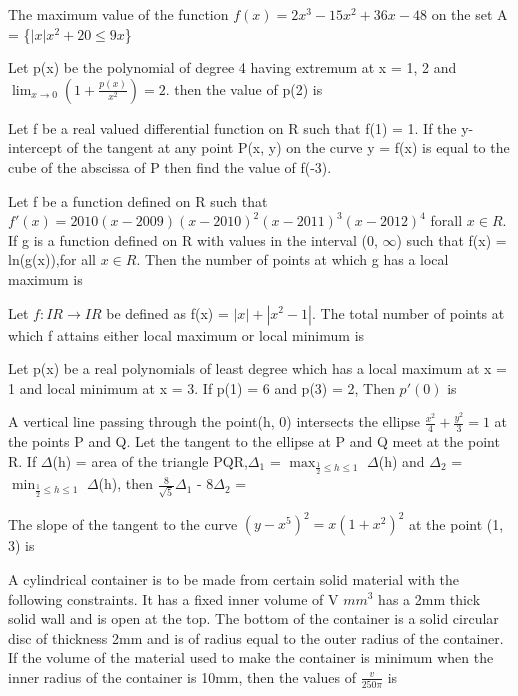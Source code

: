 \item The maximum value of the function $f(x) = 2x^3 - 15x^2 + 36x - 48$ on the set A = \{$|x|x^2 + 20 \leq 9x$\}

\item Let p(x) be the polynomial of degree 4 having extremum at x = 1, 2 and $\lim_{x \to 0}(1 + \frac{p(x)}{x^2}) = 2$. then the value of p(2) is

\item Let f be a real valued differential function on R such that f(1) = 1. If the y-intercept of the tangent at any point P(x, y) on the curve y = f(x) is equal to the cube of the abscissa of P then find the value of f(-3).

\item Let f be a function defined on R such that $f'(x) = 2010(x - 2009)(x - 2010)^2(x - 2011)^3(x - 2012)^4$ forall 
$x \in R$. If g is a function defined on R with values in the interval (0, $\infty$) such that f(x) = ln(g(x)),for all 
$x \in R$. Then the number of points at which g has a local maximum is

\item Let $f: IR \to IR$ be defined as f(x) = $|x| + |x^2 - 1|$. The total number of points at which f attains either local maximum or local minimum is 

\item Let p(x) be a real polynomials of least degree which has a local maximum at x = 1 and local minimum at x = 3. If p(1) = 6 and p(3) = 2, Then $p'(0)$ is
 
\item A vertical line passing through the point(h, 0) intersects the ellipse $\frac{x^2}{4} + \frac{y^2}{3} = 1$ at the points P and Q. Let the tangent to the ellipse at P and Q meet at the point R. If $\Delta$(h) = area of the triangle PQR,$\Delta_1$ = $\max_{\frac{1}{2}\leq h \leq 1}$ $\Delta$(h) and $\Delta_2$ = $\min_{\frac{1}{2}\leq h \leq 1}$ $\Delta$(h), then $\frac{8}{\sqrt{5}}\Delta_1$ - $8\Delta_2$ =

\item The slope of the tangent to the curve $(y - x^5)^2 = x(1 + x^2)^2$ at the point (1, 3) is

\item A cylindrical container is to be made from certain solid material with the following constraints. It has a fixed inner volume of V $mm^3$ has a 2mm thick solid wall and is open at the top. The bottom of the container is a solid circular disc of thickness 2mm and is of radius equal to the outer radius of the container. If the volume of the material used to make the container is minimum when the inner radius of the container is 10mm, then the values of 
$\frac{v}{250\pi}$ is


